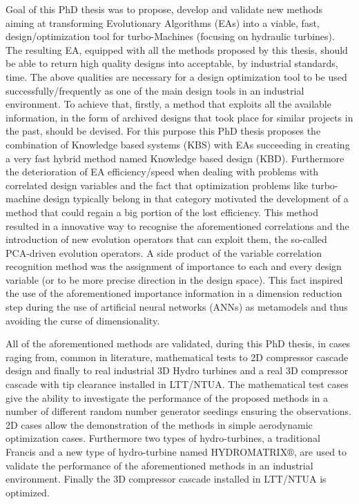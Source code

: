 Goal of this PhD thesis was to propose, develop and validate new methods aiming at transforming Evolutionary Algorithms (EAs) into a viable, fast, design/optimization tool for turbo-Machines (focusing on hydraulic turbines). The resulting EA, equipped with all the methods proposed by this thesis, should be able to return high quality designs into acceptable, by industrial standards, time. The above qualities are necessary for a design optimization tool to be used successfully/frequently as one of the main design tools in an industrial environment. To achieve that, firstly, a method that exploits all the available information, in the form of archived designs that took place for similar projects in the past, should be devised.  For this purpose this PhD thesis proposes the combination of Knowledge based systems (KBS) with EAs succeeding in creating a very fast hybrid method named Knowledge based design (KBD). Furthermore the deterioration of EA efficiency/speed when dealing with problems with correlated design variables and the fact that optimization problems like turbo-machine design typically belong in that category motivated the development of a method that could regain a big portion of the lost efficiency. This method resulted in a innovative way to recognise the aforementioned correlations and the introduction of new evolution operators that can exploit them, the so-called PCA-driven evolution operators. A side product of the variable correlation recognition method was the assignment of importance to each and every design variable (or to be more precise direction in the design space). This fact inspired the use of the aforementioned importance information in a dimension reduction step during the use of artificial neural networks (ANNs) as metamodels and thus avoiding the curse of dimensionality. 

All of the aforementioned methods are validated, during this PhD thesis, in cases raging from, common in literature,  mathematical tests to 2D compressor cascade design and finally to real industrial 3D Hydro turbines and a real 3D compressor cascade with tip clearance installed in LTT/NTUA. The mathematical test cases give the ability to investigate the performance of the proposed methods in a number of different random number generator seedings ensuring the observations. 2D cases allow the demonstration of the methods in simple aerodynamic optimization cases. Furthermore two types of hydro-turbines, a traditional Francis and a new type of hydro-turbine named HYDROMATRIX$\circledR$, are used to validate the performance of the aforementioned methods in an industrial environment. Finally the 3D compressor cascade installed in LTT/NTUA is optimized.     


